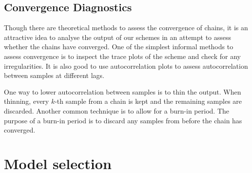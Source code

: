 \subsection{Convergence Diagnostics}
\label{ssec:convergence_diagnostics}

Though there are theoretical methods to assess the convergence of chains, it is an attractive idea to
analyse the output of our schemes in an attempt to assess whether the chains have converged. One of
the simplest informal methods to assess convergence is to inspect the trace plots of the scheme and
check for any irregularities. It is also good to use autocorrelation plots to assess autocorrelation
between samples at different lags.

One way to lower autocorrelation between samples is to thin the output. When thinning, every $k$-th
sample from a chain is kept and the remaining samples are discarded. Another common technique is to
allow for a burn-in period. The purpose of a burn-in period is to discard any samples from before the
chain has converged.

\section{Model selection}
\label{sec:model_comparison}

